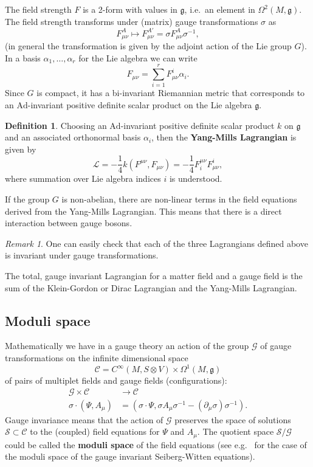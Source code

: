 \documentclass[11pt]{amsart}
\theoremstyle{definition}
\newtheorem{defn}[thm]{Definition}
\theoremstyle{remark}
\newtheorem{rem}[thm]{Remark}
\numberwithin{equation}{section}
\begin{document}
The field strength $F$ is a 2-form with values in $\mathfrak{g}$, i.e.~an element in $\Omega^2(M,\mathfrak{g})$. The field strength transforms under (matrix) gauge transformations $\sigma$ as 
\begin{equation*}
F^A_{\mu\nu}\longmapsto F^{A'}_{\mu\nu}=\sigma F^A_{\mu\nu}\sigma^{-1},
\end{equation*}
(in general the transformation is given by the adjoint action of the Lie group $G$). In a basis $\alpha_1,\ldots,\alpha_r$ for the Lie algebra we can write
\begin{equation*}
F_{\mu\nu}=\sum_{i=1}^rF_{\mu\nu}^i\alpha_i.
\end{equation*} 
Since $G$ is compact, it has a bi-invariant Riemannian metric that corresponds to an $\mathrm{Ad}$-invariant positive definite scalar product on the Lie algebra $\mathfrak{g}$. 
\begin{defn}\label{defn YM Lag}
Choosing an $\mathrm{Ad}$-invariant positive definite scalar product $k$ on $\mathfrak{g}$ and an associated orthonormal basis $\alpha_i$, then the {\bf Yang-Mills Lagrangian} is given by
\begin{equation*}
\mathcal{L}=-\frac{1}{4}k(F^{\mu\nu},F_{\mu\nu})=-\frac{1}{4}F^{\mu\nu}_iF_{\mu\nu}^i,
\end{equation*}
where summation over Lie algebra indices $i$ is understood.
\end{defn}
If the group $G$ is non-abelian, there are non-linear terms in the field equations derived from the Yang-Mills Lagrangian. This means that there is a direct interaction between gauge bosons. 
\begin{rem}
One can easily check that each of the three Lagrangians defined above is invariant under gauge transformations.
\end{rem}
The total, gauge invariant Lagrangian for a matter field and a gauge field is the sum of the Klein-Gordon or Dirac Lagrangian and the Yang-Mills Lagrangian.


\subsection{Moduli space}
Mathematically we have in a gauge theory an action of the group $\mathcal{G}$ of gauge transformations on the infinite dimensional space 
\begin{equation*}
\mathcal{C}=C^\infty(M,S\otimes V)\times\Omega^1(M,\mathfrak{g})
\end{equation*}
of pairs of multiplet fields and gauge fields (configurations):
\begin{align*}
\mathcal{G}\times\mathcal{C}&\longrightarrow\mathcal{C}\\
\sigma\cdot(\Psi,A_\mu)&=(\sigma\cdot\Psi,\sigma A_\mu \sigma^{-1}-(\partial_\mu\sigma)\sigma^{-1}).
\end{align*}
Gauge invariance means that the action of $\mathcal{G}$ preserves the space of solutions $\mathcal{S}\subset\mathcal{C}$ to the (coupled) field equations for $\Psi$ and $A_\mu$. The quotient space $\mathcal{S}/\mathcal{G}$ could be called the {\bf moduli space} of the field equations (see e.g.~\cite{Morgan} for the case of the moduli space of the gauge invariant Seiberg-Witten equations). 
\end{document}
